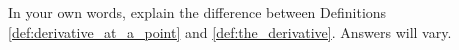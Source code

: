 {In your own words, explain the difference between Definitions \ref{def:derivative_at_a_point} and \ref{def:the_derivative}.
}
{Answers will vary.}
